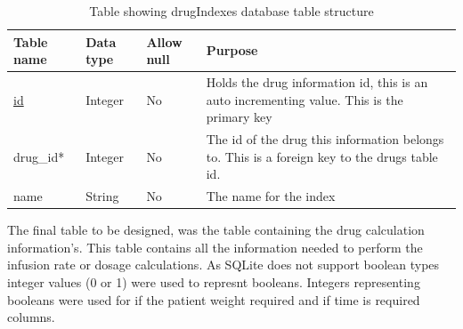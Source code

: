 \begin{center}
\begin{longtable}{|l|l|l|p{8cm}|}
\caption{Table showing drugIndexes database table structure}\tabularnewline
\hline
\textbf{Table name} & \textbf{Data type} & \textbf{Allow null} & \textbf{Purpose}                                                                             \\ \hline
\uline{id}                  & Integer            & No                  & Holds the drug information id, this is an auto incrementing value. This is the primary key   \\ \hline
drug\_id*           & Integer            & No                  & The id of the drug this information belongs to. This is a foreign key to the drugs table id. \\ \hline
name                & String             & No                  & The name for the index                                                                       \\ \hline
\end{longtable}
\end{center}

The final table to be designed, was the table containing the drug calculation information's. This table contains all the information needed to perform the infusion rate or dosage calculations. As SQLite \cite{sqlite} does not support boolean types \cite{sqlite_dt} integer values (0 or 1) were used to represnt booleans. Integers representing booleans were used for if the patient weight required and if time is required columns.


